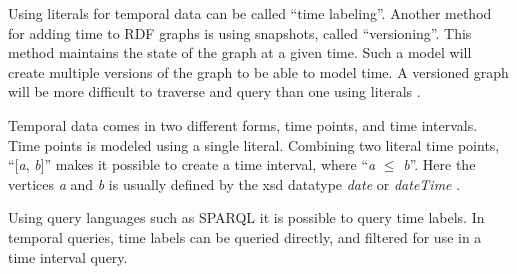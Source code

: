Using literals for temporal data can be called ``time labeling''. Another method for adding time to RDF graphs is using snapshots, called ``versioning''. This method maintains the state of the graph at a given time. Such a model will create multiple versions of the graph to be able to model time. A versioned graph will be more difficult to traverse and query than one using literals \cite{gutierrez2006introducing}. 

Temporal data comes in two different forms, time points, and time intervals. Time points is modeled using a single literal. Combining two literal time points, ``[\emph{a}, \emph{b}]'' makes it possible to create a time interval, where ``\emph{a} $\leq$ \emph{b}''. Here the vertices \emph{a} and \emph{b} is usually defined by the xsd datatype \emph{date} or \emph{dateTime} \cite{tappolet2009applied}.

Using query languages such as SPARQL it is possible to query time labels. In temporal queries, time labels can be queried directly, and filtered for use in a time interval query. 

\glsresetall